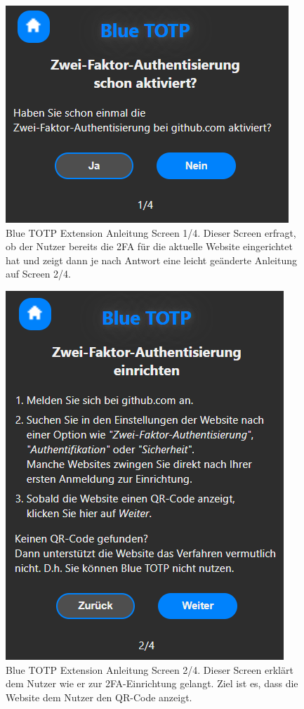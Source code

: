 \begin{figure}[H]
    \centering
    \includegraphics[width=0.5\linewidth]{figures/impl/ext_anleitung_1.png}
    \caption[Blue TOTP Extension Anleitung Screen 1/4]{Blue TOTP Extension Anleitung Screen 1/4. Dieser Screen erfragt, ob der Nutzer bereits die 2FA für die aktuelle Website eingerichtet hat und zeigt dann je nach Antwort eine leicht geänderte Anleitung auf Screen 2/4.}
    \label{fig: blue totp ext screenshot anleitung 1}
\end{figure}

\begin{figure}[H]
    \centering
    \includegraphics[width=0.5\linewidth]{figures/impl/ext_anleitung_2.png}
    \caption[Blue TOTP Extension Anleitung Screen 2/4]{Blue TOTP Extension Anleitung Screen 2/4. Dieser Screen erklärt dem Nutzer wie er zur 2FA-Einrichtung gelangt. Ziel ist es, dass die Website dem Nutzer den QR-Code anzeigt.}
    \label{fig: blue totp ext screenshot anleitung 2}
\end{figure}


